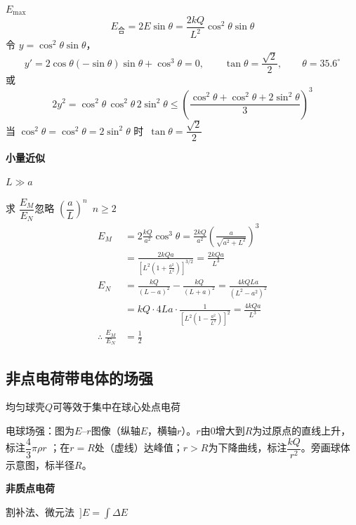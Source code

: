 $E_{\max}$
\[
E_{\text{合}}=2E\sin\theta=\frac{2kQ}{L^{2}}\cos^{2}\theta\sin\theta
\]
令 $y=\cos^{2}\theta\sin\theta$，
\[
y'=2\cos\theta(-\sin\theta)\sin\theta+\cos^{3}\theta=0,\qquad
\tan\theta=\frac{\sqrt{2}}{2},\qquad \theta=35.6^\circ
\]
或\quad
\[
2y^{2}=\cos^{2}\theta\,\cos^{2}\theta\,2\sin^{2}\theta\le\left(\frac{\cos^{2}\theta+\cos^{2}\theta+2\sin^{2}\theta}{3}\right)^{3}
\]
当 $\cos^{2}\theta=\cos^{2}\theta=2\sin^{2}\theta$ 时\ $\tan\theta=\dfrac{\sqrt{2}}{2}$

\textbf{小量近似}

$L\gg a$

求 $\dfrac{E_{M}}{E_{N}}$\quad 忽略 $\left(\dfrac{a}{L}\right)^{n}$\ $n\ge 2$
\begin{align*}
E_{M}&=2\frac{kQ}{a^{2}}\cos^{3}\theta=\frac{2kQ}{a^{2}}\left(\frac{a}{\sqrt{a^{2}+L^{2}}}\right)^{3}\\
&=\frac{2kQa}{\left[L^{2}\left(1+\frac{a^{2}}{L^{2}}\right)\right]^{3/2}}=\frac{2kQa}{L^{3}}\\
E_{N}&=\frac{kQ}{(L-a)^{2}}-\frac{kQ}{(L+a)^{2}}=\frac{4kQLa}{(L^{2}-a^{2})^{2}}\\
&=kQ\cdot4La\cdot\frac{1}{\left[L^{2}\left(1-\frac{a^{2}}{L^{2}}\right)\right]^{2}}=\frac{4kQa}{L^{3}}\\
\therefore\ \frac{E_{M}}{E_{N}}&=\frac{1}{2}
\end{align*}

\subsection{非点电荷带电体的场强}
均匀球壳$Q$可等效于集中在球心处点电荷

电球场强：图为$E$--$r$图像（纵轴$E$，横轴$r$）。$r$由0增大到$R$为过原点的直线上升，标注$\dfrac{4}{3}\pi\rho r$ %
；在$r=R$处（虚线）达峰值；$r>R$为下降曲线，标注$\dfrac{kQ}{r^2}$。旁画球体示意图，标半径$R$。

\textbf{非质点电荷}

割补法、微元法\ $\rbrack$\quad $E=\int\Delta E$

